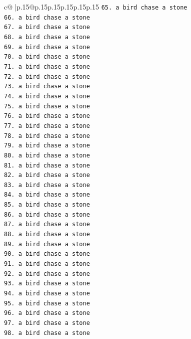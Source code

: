 \documentclass{article}
\begin{document}
{\begin{supertabular}{c@{$\;$}|p{.15\linewidth}@{}p{.15\linewidth}p{.15\linewidth}p{.15\linewidth}p{.15\linewidth}p{.15\linewidth}}
{{{\texttt{65. a bird chase a stone} \\
\texttt{66. a bird chase a stone} \\
\texttt{67. a bird chase a stone} \\
\texttt{68. a bird chase a stone} \\
\texttt{69. a bird chase a stone} \\
\texttt{70. a bird chase a stone} \\
\texttt{71. a bird chase a stone} \\
\texttt{72. a bird chase a stone} \\
\texttt{73. a bird chase a stone} \\
\texttt{74. a bird chase a stone} \\
\texttt{75. a bird chase a stone} \\
\texttt{76. a bird chase a stone} \\
\texttt{77. a bird chase a stone} \\
\texttt{78. a bird chase a stone} \\
\texttt{79. a bird chase a stone} \\
\texttt{80. a bird chase a stone} \\
\texttt{81. a bird chase a stone} \\
\texttt{82. a bird chase a stone} \\
\texttt{83. a bird chase a stone} \\
\texttt{84. a bird chase a stone} \\
\texttt{85. a bird chase a stone} \\
\texttt{86. a bird chase a stone} \\
\texttt{87. a bird chase a stone} \\
\texttt{88. a bird chase a stone} \\
\texttt{89. a bird chase a stone} \\
\texttt{90. a bird chase a stone} \\
\texttt{91. a bird chase a stone} \\
\texttt{92. a bird chase a stone} \\
\texttt{93. a bird chase a stone} \\
\texttt{94. a bird chase a stone} \\
\texttt{95. a bird chase a stone} \\
\texttt{96. a bird chase a stone} \\
\texttt{97. a bird chase a stone} \\
\texttt{98. a bird chase a stone} \\
}}}
\end{supertabular}}
\end{document}
